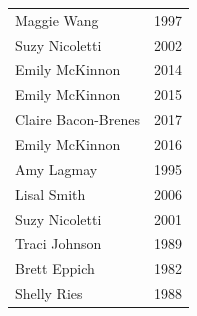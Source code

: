 \begin{table}[H]
\begin{minipage}[t]{0.48\textwidth}
\begin{tabular}{@{}p{2.8cm}p{1.2cm}@{}}
    Maggie Wang & 1997 \\
    Suzy Nicoletti & 2002 \\
    Emily McKinnon & 2014 \\
    Emily McKinnon & 2015 \\
    Claire Bacon-Brenes & 2017 \\
    Emily McKinnon & 2016 \\
    Amy Lagmay & 1995 \\
    Lisal Smith & 2006 \\
    Suzy Nicoletti & 2001 \\
    Traci Johnson & 1989 \\
    Brett Eppich & 1982 \\
    Shelly Ries & 1988 \\
\hline
\end{tabular}
\end{minipage}
\end{table}

